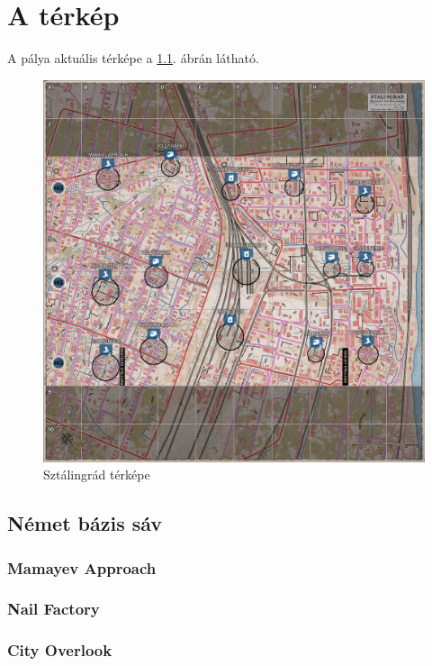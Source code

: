 \chapter{A térkép}
A pálya aktuális térképe a \ref{fig:stalingrad}. ábrán látható.

\begin{figure}
    \centering
    \includegraphics[width=150mm, keepaspectratio]{figures/StalingradMap.png}
    \caption{Sztálingrád térképe}
    \label{fig:stalingrad}
\end{figure}

\section{Német bázis sáv}
\subsection{Mamayev Approach}

\subsection{Nail Factory}

\subsection{City Overlook}

